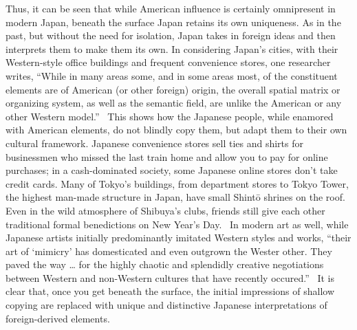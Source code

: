 \documentclass[12pt]{article}
\begin{document}
Thus, it can be seen that while American influence is certainly omnipresent in modern Japan, beneath the surface Japan retains its own uniqueness.  As in the past, but without the need for isolation, Japan takes in foreign ideas and then interprets them to make them its own.  In considering Japan's cities, with their Western-style office buildings and frequent convenience stores, one researcher writes,
``While in many areas some, and in some areas most, of the constituent elements are of American (or other foreign) origin, the overall spatial matrix or organizing system, as well as the semantic field, are unlike the American or any other Western model.''~\cHopGlob{\citep[pg.\ 73]}
This shows how the Japanese people, while enamored with American elements, do not blindly copy them, but adapt them to their own cultural framework.  Japanese convenience stores sell ties and shirts for businessmen who missed the last train home and allow you to pay for online purchases; in a cash-dominated society, some Japanese online stores don't take credit cards.  Many of Tokyo's buildings, from department stores to Tokyo Tower, the highest man-made structure in Japan, have small Shint\=o shrines on the roof.  Even in the wild atmosphere of Shibuya's clubs, friends still give each other traditional formal benedictions on New Year's Day.~\cHopGlob{\citep[pg.\ 380]}  In modern art as well, while Japanese artists initially predominantly imitated Western styles and works, ``their art of `mimicry' has domesticated and even outgrown the Wester other.  They paved the way \ldots{} for the highly chaotic and splendidly creative negotiations between Western and non-Western cultures that have recently occured.''~\cWaiting{\citep[pg.\ 233]}
It is clear that, once you get beneath the surface, the initial impressions of shallow copying are replaced with unique and distinctive Japanese interpretations of foreign-derived elements.
\end{document}
